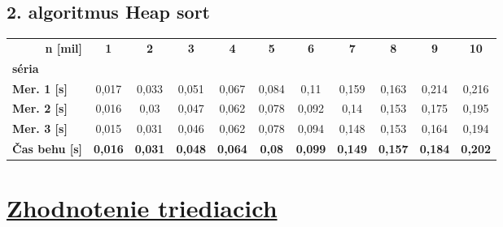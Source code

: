 \documentclass[12pt]{article}
\begin{document}
    \subsection*{2. algoritmus Heap sort}

        \begin{table}[!h]
\begin{tabular}{|l|c|c|c|c|c|c|c|c|c|c|}
\hline
\multicolumn{1}{|r|}{\textbf{n {[}mil{]}}} & \multirow{2}{*}{\textbf{1}} & \multirow{2}{*}{\textbf{2}} & \multirow{2}{*}{\textbf{3}} & \multirow{2}{*}{\textbf{4}} & \multirow{2}{*}{\textbf{5}} & \multirow{2}{*}{\textbf{6}} & \multirow{2}{*}{\textbf{7}} & \multirow{2}{*}{\textbf{8}} & \multirow{2}{*}{\textbf{9}} & \multirow{2}{*}{\textbf{10}} \\ \cline{1-1}
\textbf{séria}                             &                             &                             &                             &                             &                             &                             &                             &                             &                             &                              \\ \hline
\textbf{Mer. 1 {[}s{]}}                    & 0,017                       & 0,033                       & 0,051                       & 0,067                       & 0,084                       & 0,11                        & 0,159                       & 0,163                       & 0,214                       & 0,216                        \\ \hline
\textbf{Mer. 2 {[}s{]}}                    & 0,016                       & 0,03                        & 0,047                       & 0,062                       & 0,078                       & 0,092                       & 0,14                        & 0,153                       & 0,175                       & 0,195                        \\ \hline
\textbf{Mer. 3 {[}s{]}}                    & 0,015                       & 0,031                       & 0,046                       & 0,062                       & 0,078                       & 0,094                       & 0,148                       & 0,153                       & 0,164                       & 0,194                        \\ \hline
\textbf{Čas behu {[}s{]}}                  & \textbf{0,016}              & \textbf{0,031}              & \textbf{0,048}              & \textbf{0,064}              & \textbf{0,08}               & \textbf{0,099}              & \textbf{0,149}              & \textbf{0,157}              & \textbf{0,184}              & \textbf{0,202}               \\ \hline
\end{tabular}
\end{table}
\newpage
\section{\underline{Zhodnotenie triediacich}}


    \begin{center}
        \centerline{}
    \end{center}
\end{document}
